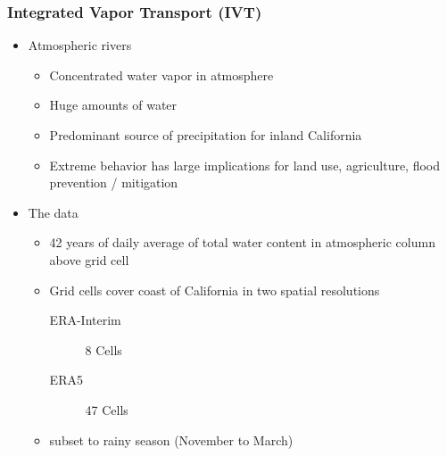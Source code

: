 \documentclass[aspectratio=169,10pt]{beamer}
\begin{document}
\begin{frame}
  \frametitle{Integrated Vapor Transport (IVT)}
  \begin{minipage}{.7\textwidth}
    \begin{itemize}
        \item Atmospheric rivers~\citep{ralph2013,ralph2018}
            \begin{itemize}
                \item Concentrated water vapor in atmosphere
                \item Huge amounts of water
                \item Predominant source of precipitation for 
                    inland California
                \item Extreme behavior has large implications 
                    for land use, agriculture, flood prevention / mitigation
            \end{itemize}
        \item The data~\citep{guan2015}
            \begin{itemize}
                \item 42 years of daily average of total water content 
                    in atmospheric column above grid cell
                \item Grid cells cover coast of California in two 
                    spatial resolutions
                    \begin{description}
                        \item[ERA-Interim] 8 Cells
                        \item[ERA5] 47 Cells
                    \end{description}
                \item subset to rainy season (November to March)
            \end{itemize}
    \end{itemize}
  \end{minipage}
  ~\hfill
  \begin{minipage}{.25\textwidth}
    \centering

\end{minipage}
\end{frame}
\end{document}
